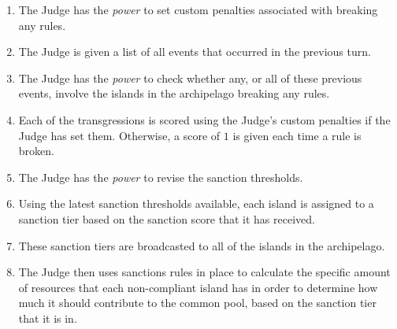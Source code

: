 
    \begin{enumerate}
        \item The Judge has the \emph{power} to set custom penalties associated with breaking any rules.
        \item The Judge is given a list of all events that occurred in the previous turn.
        \item The Judge has the \emph{power} to check whether any, or all of these previous events, involve the islands in the archipelago breaking any rules.
        \item Each of the transgressions is scored using the Judge's custom penalties if the Judge has set them. Otherwise, a score of $1$ is given each time a rule is broken.
        \item The Judge has the \emph{power} to revise the sanction thresholds.
        \item Using the latest sanction thresholds available, each island is assigned to a sanction tier based on the sanction score that it has received.
        \item These sanction tiers are broadcasted to all of the islands in the archipelago.
        \item The Judge then uses sanctions rules in place to calculate the specific amount of resources that each non-compliant island has in order to determine how much it should contribute to the common pool, based on the sanction tier that it is in.
    \end{enumerate}



